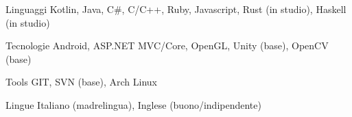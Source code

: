 

\begin{cvskills}

  \cvskill
    {Linguaggi} %
    {Kotlin, Java, C\#, C/C++, Ruby, Javascript, Rust (in studio), Haskell (in studio)} %

  \cvskill
    {Tecnologie} %
    {Android, ASP.NET MVC/Core, OpenGL, Unity (base), OpenCV (base)} %

  \cvskill
    {Tools} %
    {GIT, SVN (base), Arch Linux} %

  \cvskill
    {Lingue} %
    {Italiano (madrelingua), Inglese (buono/indipendente)} %

\end{cvskills}
